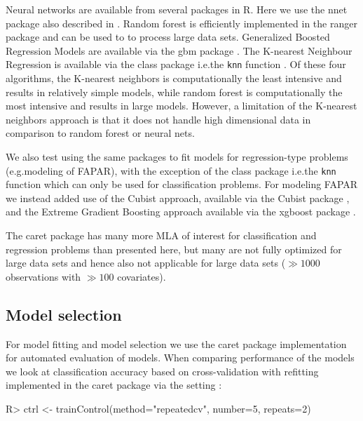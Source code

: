 \documentclass[fleqn,10pt,lineno]{wlpeerj} %
\begin{document}
Neural networks are available from several packages in \textsf{R}. Here we use the \textsf{nnet} package \citep{Ripley2017nnet} also described in \citet{Venables2002Springer}. Random forest is efficiently implemented in the \textsf{ranger} package \citep{Wright2016} and can be used to to process large data sets. Generalized Boosted Regression Models are available via the \textsf{gbm} package \citep{ridgeway2010gbm}. The K-nearest Neighbour Regression is available via the \textsf{class} package i.e.\@ the \texttt{knn} function \citep{Venables2002Springer}. Of these four algorithms, the K-nearest neighbors is computationally the least intensive and results in relatively simple models, while random forest is computationally the most intensive and results in large models. However, a limitation of the K-nearest neighbors approach is that it does not handle high dimensional data in comparison to random forest or neural nets.\par

We also test using the same packages to fit models for regression-type problems (e.g.\@ modeling of FAPAR), with the exception of the \textsf{class} package i.e.\@ the \texttt{knn} function which can only be used for classification problems. For modeling FAPAR we instead added use of the Cubist approach, available via the \textsf{Cubist} package \citep{kuhn2014cubist}, and the Extreme Gradient Boosting approach available via the \textsf{xgboost} package \citep{Chen2016}.\par 

The \textsf{caret} package has many more MLA of interest for classification and regression problems than presented here, but many are not fully optimized for large data sets and hence also not applicable for large data sets ($\gg 1000$ observations with $\gg 100$ covariates).\par

\subsection*{Model selection}

For model fitting and model selection we use the \textsf{caret} package implementation for automated evaluation of models. When comparing performance of the models we look at classification accuracy based on cross-validation with refitting implemented in the \textsf{caret} package via the setting \citep{JSSv028i05,kuhn2013applied}:

\begin{Schunk}
\begin{Sinput}
R> ctrl <- trainControl(method="repeatedcv", number=5, repeats=2)
\end{Sinput}
\end{Schunk}
\end{document}
